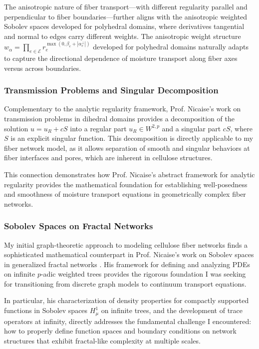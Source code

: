 \documentclass[11pt]{article}
\begin{document}
The anisotropic nature of fiber transport—with different regularity parallel and perpendicular to fiber boundaries—further aligns with the anisotropic weighted Sobolev spaces developed for polyhedral domains, where derivatives tangential and normal to edges carry different weights. The anisotropic weight structure $w_\alpha = \prod_{e\in \mathcal{E}} r_e^{\max(0,\beta_e + |\alpha_e^\perp|)}$ developed for polyhedral domains naturally adapts to capture the directional dependence of moisture transport along fiber axes versus across boundaries.

\subsubsection{Transmission Problems and Singular Decomposition}

Complementary to the analytic regularity framework, Prof. Nicaise's work on transmission problems in dihedral domains \cite{aibeche2007p} provides a decomposition of the solution $u = u_R + cS$ into a regular part $u_R \in W^{2,p}$ and a singular part $cS$, where $S$ is an explicit singular function. This decomposition is directly applicable to my fiber network model, as it allows separation of smooth and singular behaviors at fiber interfaces and pores, which are inherent in cellulose structures.

This connection demonstrates how Prof. Nicaise's abstract framework for analytic regularity provides the mathematical foundation for establishing well-posedness and smoothness of moisture transport equations in geometrically complex fiber networks.

\subsubsection{Sobolev Spaces on Fractal Networks}
My initial graph-theoretic approach to modeling cellulose fiber networks finds a sophisticated mathematical counterpart in Prof. Nicaise's work on Sobolev spaces in generalized fractal networks \cite{nicaise2018density}. His framework for defining and analyzing PDEs on infinite $p$-adic weighted trees provides the rigorous foundation I was seeking for transitioning from discrete graph models to continuum transport equations.

In particular, his characterization of density properties for compactly supported functions in Sobolev spaces $H^1_\mu$ on infinite trees, and the development of trace operators at infinity, directly addresses the fundamental challenge I encountered: how to properly define function spaces and boundary conditions on network structures that exhibit fractal-like complexity at multiple scales.
\end{document}
